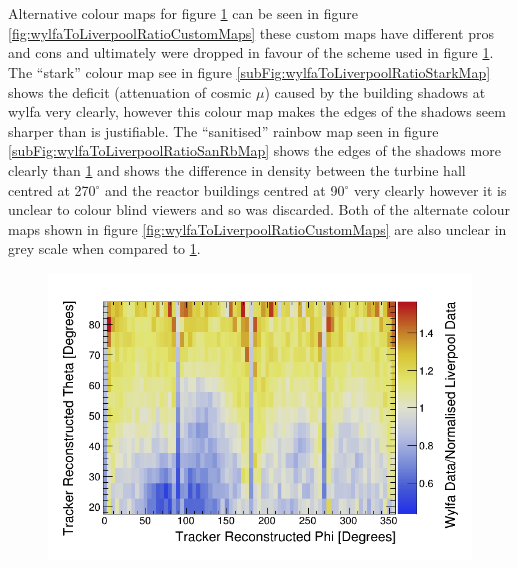 \\\\ Alternative colour maps for figure \ref{fig:wylfaDivLiverpool} can be seen in figure \ref{fig:wylfaToLiverpoolRatioCustomMaps} these custom maps have different pros and cons and ultimately were dropped in favour of the scheme used in figure \ref{fig:wylfaDivLiverpool}. The ``stark'' colour map see in figure  \ref{subFig:wylfaToLiverpoolRatioStarkMap} shows the deficit (attenuation of cosmic $\mu$) caused by the building shadows at wylfa very clearly, however this colour map makes the edges of the shadows seem sharper than is justifiable. The ``sanitised'' rainbow map seen in figure \ref{subFig:wylfaToLiverpoolRatioSanRbMap} shows the edges of the shadows more clearly than \ref{fig:wylfaDivLiverpool} and shows the difference in density between the turbine hall centred at 270$^{\circ}$ and the reactor buildings centred at 90$^{\circ}$ very clearly however it is unclear to colour blind viewers and so was discarded. Both of the alternate colour maps shown in figure \ref{fig:wylfaToLiverpoolRatioCustomMaps} are also unclear in grey scale when compared to \ref{fig:wylfaDivLiverpool}.
   
\begin{figure}[H]
 \centering
 \includegraphics[width=1.0\linewidth]{Chapter5/Figs/Raster/wylfaToLiverpoolRatioDynamic17.5-87.5.png}
 \label{fig:wylfaDivLiverpool}
\end{figure}

